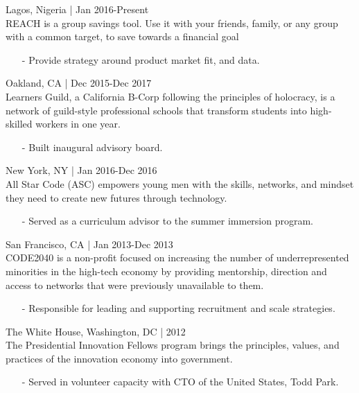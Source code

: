 \documentclass[11pt,article,oneside]{memoir}
\begin{document}
\bigskip

\medskip

 \hfill Lagos, Nigeria | Jan 2016-Present\\
REACH is a group savings tool. Use it with your friends, family, or any group with a common target, to save towards a financial goal
\begin{itemize}[nolistsep]
\item[-] Provide strategy around product market fit, and data.
\end{itemize}  

 \hfill Oakland, CA | Dec 2015-Dec 2017\\
Learners Guild, a California B-Corp following the principles of holocracy, is a network of guild-style professional schools that transform students into high-skilled workers in one year.
\begin{itemize}[noitemsep,nolistsep]
\item[-] Built inaugural advisory board.
\end{itemize}

 \hfill New York, NY | Jan 2016-Dec 2016\\
All Star Code (ASC) empowers young men with the skills, networks, and mindset they need to create new futures through technology. 
\begin{itemize}[noitemsep,nolistsep]
\item[-] Served as a curriculum advisor to the summer immersion program.
\end{itemize}

 \hfill San Francisco, CA | Jan 2013-Dec 2013\\
CODE2040 is a non-profit focused on increasing the number of underrepresented minorities in the high-tech economy by providing mentorship, direction and access to networks that were previously unavailable to them.
\begin{itemize}[nolistsep]
\item[-] Responsible for leading and supporting recruitment and scale strategies.
\end{itemize} 

 \hfill The White House, Washington, DC | 2012\\
The Presidential Innovation Fellows program brings the principles, values, and practices of the innovation economy into government.
\begin{itemize}[nolistsep]
\item[-] Served in volunteer capacity with CTO of the United States, Todd Park.
\end{itemize} 
\end{document}
